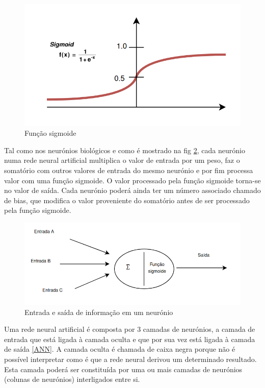 \begin{figure}[H]
\centering
\includegraphics[scale=0.3]{figs/sigmoid}
\caption{Função sigmoide }\label{sigmoidF}
\end{figure}


Tal como nos neurónios biológicos e como é mostrado na fig \ref{node1}, cada neurónio numa rede neural artificial multiplica o valor de entrada por um peso, faz o somatório com outros valores de entrada do mesmo neurónio e por fim processa valor com uma função sigmoide. O valor processado pela função sigmoide torna-se no valor de saída. Cada neurónio poderá ainda ter um número associado chamado de bias, que modifica o valor proveniente do somatório antes de ser processado pela função sigmoide.


\begin{figure}[H]
\centering
\includegraphics[scale=0.3]{figs/node1.png}
\caption{Entrada e saída de informação em um neurónio} \label{node1}
\end{figure}

Uma rede neural artificial é composta por 3 camadas de neurónios, a camada de entrada que está ligada à camada oculta e que por sua vez está ligada à camada de saída \ref{ANN}. A camada oculta é chamada de caixa negra porque não é possível interpretar como é que a rede neural derivou um determinado resultado. Esta camada poderá ser constituída por uma ou mais camadas de neurónios (colunas de neurónios) interligados entre si.

